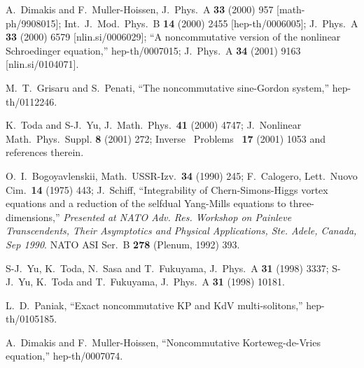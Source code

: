 \documentclass[a4paper,12pt]{article}\setlength{\topmargin}{-1cm}
\begin{document}
\begin{thebibliography}{99}
A.~Dimakis and F.~Muller-Hoissen,
J.\ Phys.\ A {\bf 33} (2000) 957
[math-ph/9908015];
Int.\ J.\ Mod.\ Phys.\ B {\bf 14} (2000) 2455
[hep-th/0006005];
J.\ Phys.\ A {\bf 33} (2000) 6579
[nlin.si/0006029];
``A noncommutative version of the nonlinear Schroedinger equation,''
hep-th/0007015;
J.\ Phys.\ A {\bf 34} (2001) 9163
[nlin.si/0104071].

M.~T.~Grisaru and S.~Penati,
``The noncommutative sine-Gordon system,''
hep-th/0112246.

K.~Toda and S-J.~Yu,
J.\ Math.\ Phys.\ {\bf 41} (2000) 4747;
J.\ Nonlinear Math.\ Phys.\ Suppl. {\bf 8} (2001) 272;
Inverse \ Problems \ {\bf 17} (2001) 1053 and references therein.

O.~I.~Bogoyavlenskii,
Math.\ USSR-Izv.\ {\bf 34} (1990) 245;
F.~Calogero,
Lett.\ Nuovo Cim.\  {\bf 14} (1975) 443;
J.~Schiff,
``Integrability of Chern-Simons-Higgs vortex equations and a reduction 
of the selfdual Yang-Mills equations to three-dimensions,''
{\it Presented at NATO Adv. Res. Workshop on Painleve Transcendents, Their 
Asymptotics and Physical Applications, Ste. Adele, Canada, Sep 1990}.
NATO ASI Ser.\ B {\bf 278} (Plenum, 1992) 393.

S-J.~Yu, K.~Toda, N.~Sasa and T.~Fukuyama,
J.\ Phys.\ A {\bf 31} (1998) 3337;
S-J.~Yu, K.~Toda and T.~Fukuyama,
J.\ Phys.\ A {\bf 31} (1998) 10181.

L.~D.~Paniak,
``Exact noncommutative KP and KdV multi-solitons,''
hep-th/0105185.

A.~Dimakis and F.~Muller-Hoissen,
``Noncommutative Korteweg-de-Vries equation,''
hep-th/0007074.


\end{thebibliography}
\end{document}

